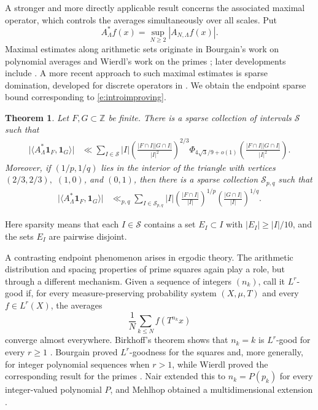 \documentclass[12pt,reqno]{amsart}
\numberwithin{equation}{section}
\newtheorem{theorem}[equation]{Theorem}
\theoremstyle{definition}
\theoremstyle{remark}
\begin{document}
\medskip


A stronger and more directly applicable result concerns the associated
maximal operator, which controls the averages simultaneously over all
scales.  Put
\[
 A_\Lambda^*f(x)=\sup_{N\geq2}|A_{N,\Lambda}f(x)|.
\]
Maximal estimates along arithmetic sets originate in Bourgain's work on
polynomial averages and Wierdl's work on the primes
\cite{B88,B88b,B89,W89}; later developments include
\cite{MST,LHF,HLKF,HKLMY}. 
A more recent approach to such maximal estimates is sparse domination,
developed for discrete operators in \cite{KL20,H20,CDY,FN}.  We obtain
the endpoint sparse bound corresponding to \eqref{e:introimproving}.

\begin{theorem}\label{t:sparsebound}
Let \(F,G\subset\mathbb Z\) be finite.  There is a sparse collection of
intervals \(\mathcal S\) such that
\begin{align}\label{e:introsparse}
 \bigl|\langle A_\Lambda^*\mathbf1_F,\mathbf1_G\rangle\bigr|
 &\ll \sum_{I\in\mathcal S}|I|
 \left(\frac{|F\cap I||G\cap I|}{|I|^2}\right)^{2/3}
 \Phi_{4\sqrt3/9+o(1)}
 \left(\frac{|F\cap I||G\cap I|}{|I|^2}\right).
\end{align}
Moreover, if \((1/p,1/q)\) lies in the interior of the triangle with
vertices $(2/3,2/3),$ $(1,0)$, and $(0,1)$, 
then there is a sparse collection \(\mathcal S_{p,q}\) such that
\begin{align}\label{e:introsparseopen}
 \bigl|\langle A_\Lambda^*\mathbf1_F,\mathbf1_G\rangle\bigr|
 &\ll_{p,q}
 \sum_{I\in\mathcal S_{p,q}}|I|
 \left(\frac{|F\cap I|}{|I|}\right)^{1/p}
 \left(\frac{|G\cap I|}{|I|}\right)^{1/q}.
\end{align}
\end{theorem}

Here sparsity means that each \(I\in\mathcal S\) contains a set
\(E_I\subset I\) with \(|E_I|\geq |I|/10\), and the sets \(E_I\) are
pairwise disjoint.


\medskip



A contrasting endpoint phenomenon arises in ergodic theory.
The arithmetic distribution and spacing properties of prime squares
again play a role, but through a different mechanism.
Given a sequence of integers \((n_k)\), call it \(L^r\)-good if,
for every measure-preserving probability system \((X,\mu,T)\)
and every \(f\in L^r(X)\), the averages
\[
 \frac1N\sum_{k\leq N}f(T^{n_k}x)
\]
converge almost everywhere.
Birkhoff's theorem shows that \(n_k=k\) is \(L^r\)-good for every
\(r\geq1\) \cite{B31}.
Bourgain proved \(L^r\)-goodness for the squares and, more generally,
for integer polynomial sequences when \(r>1\), while Wierdl proved
the corresponding result for the primes \cite{B89,W89}.
Nair extended this to \(n_k=P(p_k)\) for every integer-valued
polynomial \(P\), and Mehlhop obtained a multidimensional extension
\cite{nair,melhop}.
\end{document}

